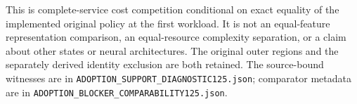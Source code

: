 This is complete-service cost competition conditional on exact equality
of the implemented original policy at the first workload. It is not an
equal-feature representation comparison, an equal-resource complexity
separation, or a claim about other states or neural architectures.
The original outer regions and the separately derived identity exclusion
are both retained. The source-bound witnesses are in
\texttt{ADOPTION\_SUPPORT\_DIAGNOSTIC125.json}; comparator metadata are
in \texttt{ADOPTION\_BLOCKER\_COMPARABILITY125.json}.
